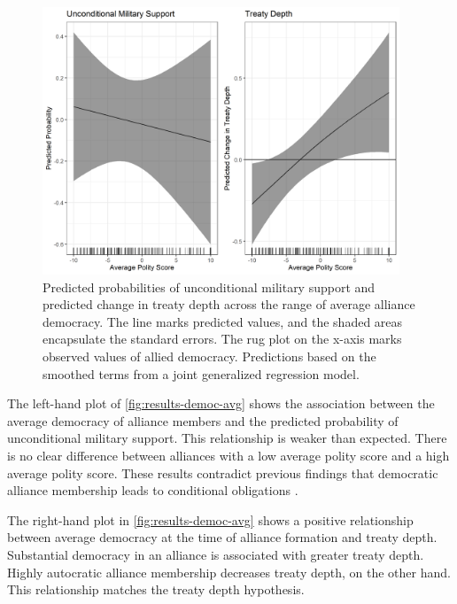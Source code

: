 \documentclass[12pt]{article}
\begin{document}
\begin{figure}[hbtp]
\centering
\includegraphics[width=0.95\textwidth]{../figures/results-democ-avg.png}
\caption{Predicted probabilities of unconditional military support and predicted change in treaty depth across the range of average alliance democracy. The line marks predicted values, and the shaded areas encapsulate the standard errors. The rug plot on the x-axis marks observed values of allied democracy. Predictions based on the smoothed terms from a joint generalized regression model.}
\label{fig:results-democ-avg}
\end{figure}


The left-hand plot of \autoref{fig:results-democ-avg} shows the association between the average democracy of alliance members and the predicted probability of unconditional military support. 
This relationship is weaker than expected.  
There is no clear difference between alliances with a low average polity score and a high average polity score. 
These results contradict previous findings that democratic alliance membership leads to conditional obligations \citep{Mattes2012, Chibaetal2015}.


The right-hand plot in \autoref{fig:results-democ-avg} shows a positive relationship between average democracy at the time of alliance formation and treaty depth.
Substantial democracy in an alliance is associated with greater treaty depth. 
Highly autocratic alliance membership decreases treaty depth, on the other hand. 
This relationship matches the treaty depth hypothesis. 
\end{document}
